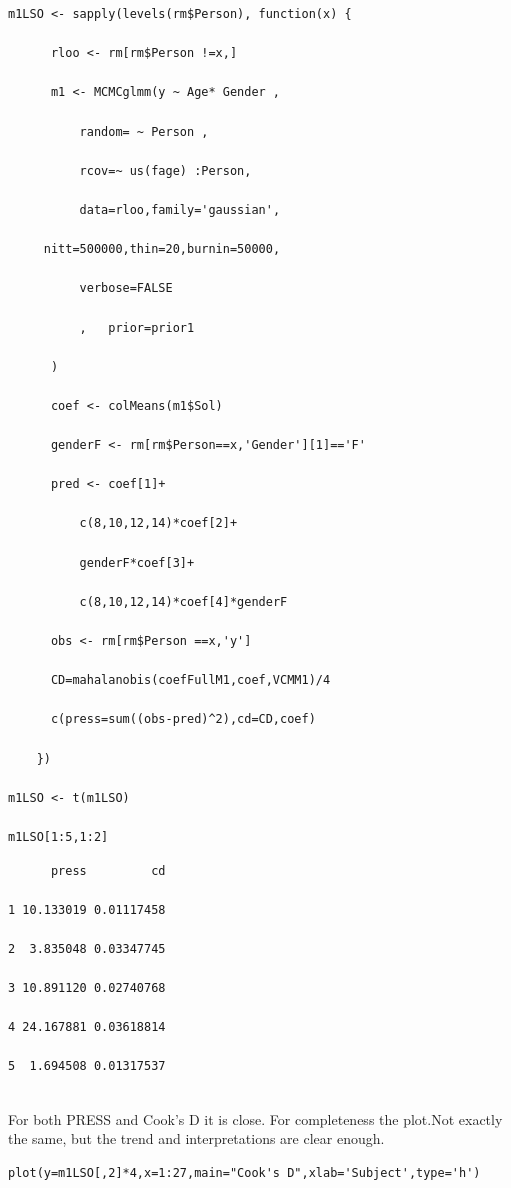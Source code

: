 \documentclass[a4paper,12pt]{article}
\begin{document}
\begin{framed}
	\begin{verbatim}
m1LSO <- sapply(levels(rm$Person), function(x) {

      rloo <- rm[rm$Person !=x,]

      m1 <- MCMCglmm(y ~ Age* Gender , 

          random= ~ Person ,

          rcov=~ us(fage) :Person,

          data=rloo,family='gaussian',

     nitt=500000,thin=20,burnin=50000,

          verbose=FALSE

          ,   prior=prior1

      )

      coef <- colMeans(m1$Sol)

      genderF <- rm[rm$Person==x,'Gender'][1]=='F'

      pred <- coef[1]+

          c(8,10,12,14)*coef[2]+

          genderF*coef[3]+

          c(8,10,12,14)*coef[4]*genderF

      obs <- rm[rm$Person ==x,'y']

      CD=mahalanobis(coefFullM1,coef,VCMM1)/4

      c(press=sum((obs-pred)^2),cd=CD,coef)

    })

m1LSO <- t(m1LSO)

m1LSO[1:5,1:2]

\end{verbatim}
\end{framed}
\begin{framed}
	\begin{verbatim}
      press         cd

1 10.133019 0.01117458

2  3.835048 0.03347745

3 10.891120 0.02740768

4 24.167881 0.03618814

5  1.694508 0.01317537


\end{verbatim}
\end{framed}
For both PRESS and Cook's D it is close. For completeness the plot.Not exactly the same, but the trend and interpretations are clear enough.
\begin{framed}
	\begin{verbatim}
plot(y=m1LSO[,2]*4,x=1:27,main="Cook's D",xlab='Subject',type='h')
\end{verbatim}
\end{framed}
\end{document}
